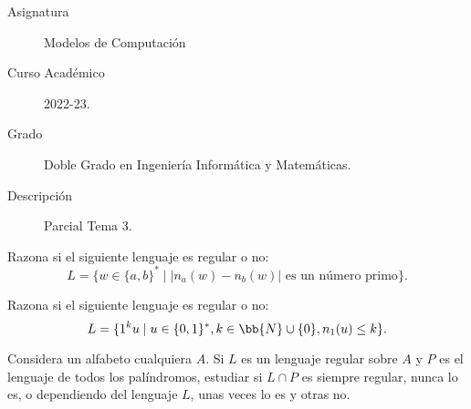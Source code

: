 \documentclass[12pt]{article}
\begin{document}

    
    

    \begin{description}
        \item[Asignatura] Modelos de Computación
        \item[Curso Académico] 2022-23.
        \item[Grado] Doble Grado en Ingeniería Informática y Matemáticas.
        \item[Descripción] Parcial Tema 3.
    \end{description}
    \newpage
    
    \begin{ejercicio}
        Razona si el siguiente lenguaje es regular o no:
        \begin{equation*}
            L=\{w\in \{a,b\}^* \mid |n_a(w)-n_b(w)| \text{ es un número primo}\}.
        \end{equation*}
    \end{ejercicio}

    \begin{ejercicio}
        Razona si el siguiente lenguaje es regular o no:
        \begin{equation*}
            L=\{1^k u\mid u\in \{0,1\}^*, k\in \bb{N}\cup \{0\}, n_1(u)\leq k\}.
        \end{equation*}
    \end{ejercicio}

    \begin{ejercicio}
        Considera un alfabeto cualquiera $A$. Si $L$ es un lenguaje regular sobre $A$ y $P$ es el lenguaje de todos los
        palíndromos, estudiar si $L\cap P$ es siempre regular, nunca lo es, o dependiendo del lenguaje $L$, unas veces lo es y otras no.
    \end{ejercicio}
\end{document}
